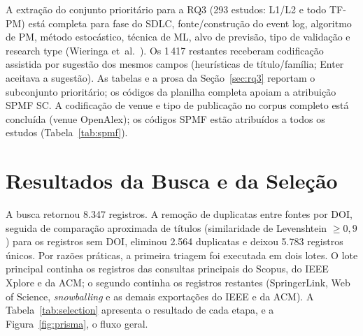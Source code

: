 \documentclass[preprint,12pt,authoryear=false]{elsarticle}
\newcommand{\PM}{TF-PM}
\begin{document}
A extração do conjunto prioritário para a RQ3 (293 estudos: L1/L2 e todo \PM{}) está completa para fase do SDLC, fonte/construção do event log, algoritmo de PM, método estocástico, técnica de ML, alvo de previsão, tipo de validação e research type (Wieringa et~al.~\cite{wieringa2006}). Os 1\,417 restantes receberam codificação assistida por sugestão dos mesmos campos (heurísticas de título/família; Enter aceitava a sugestão). As tabelas e a prosa da Seção~\ref{sec:rq3} reportam o subconjunto prioritário; os códigos da planilha completa apoiam a atribuição SPMF SC. A codificação de venue e tipo de publicação no corpus completo está concluída (venue OpenAlex); os códigos SPMF estão atribuídos a todos os estudos (Tabela~\ref{tab:spmf}).

\section{Resultados da Busca e da Seleção}\label{sec:selection}

A busca retornou 8.347 registros. A remoção de duplicatas entre fontes por DOI, seguida de comparação aproximada de títulos (similaridade de Levenshtein $\geq 0{,}9$) para os registros sem DOI, eliminou 2.564 duplicatas e deixou 5.783 registros únicos. Por razões práticas, a primeira triagem foi executada em dois lotes. O lote principal continha os registros das consultas principais do Scopus, do IEEE Xplore e da ACM; o segundo continha os registros restantes (SpringerLink, Web of Science, \emph{snowballing} e as demais exportações do IEEE e da ACM). A Tabela~\ref{tab:selection} apresenta o resultado de cada etapa, e a Figura~\ref{fig:prisma}, o fluxo geral.
\end{document}
